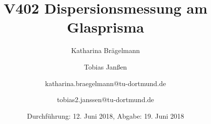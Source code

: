 
\title{V402 Dispersionsmessung am Glasprisma}
\author{Katharina Brägelmann \and Tobias Janßen \and katharina.braegelmann@tu-dortmund.de \and tobias2.janssen@tu-dortmund.de}
\date{Durchführung: 12. Juni 2018, Abgabe: 19. Juni 2018}
\maketitle

\tableofcontents
